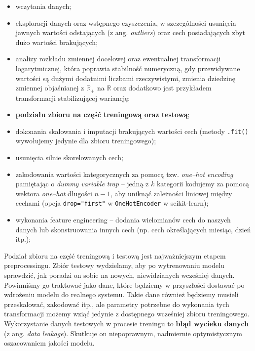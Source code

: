 \documentclass{myclass}
\numberwithin{equation}{section}
\begin{document}
\begin{itemize}
   
    \item wczytania danych;
    
    \item eksploracji danych oraz wstępnego czyszczenia, w szczególności usunięcia jawnych wartości
    odstających (z ang. \textit{outliers}) oraz cech posiadających zbyt dużo wartości brakujących;

    \item analizy rozkładu zmiennej docelowej oraz ewentualnej transformacji logarytmicznej, która
    poprawia stabilność numeryczną, gdy przewidywane wartości są dużymi dodatnimi liczbami
    rzeczywistymi, zmienia dziedzinę zmiennej objaśnianej z \(\mathbb{R}_+\) na \(\mathbb{R}\) oraz
    dodatkowo jest przykładem transformacji stabilizującej wariancję;
    
    \item \textbf{podziału zbioru na część treningową oraz testową};

    \item dokonania skalowania i imputacji brakujących wartości cech (metody \texttt{.fit()}
    wywołujemy jedynie dla zbioru treningowego);

    \item usunięcia silnie skorelowanych cech;

    \item zakodowania wartości kategorycznych za pomocą tzw. \textit{one--hot encoding} pamiętając o
    \textit{dummy variable trap} -- jedną z \(k\) kategorii kodujemy za pomocą wektora
    \textit{one--hot} długości \(n-1\), aby uniknąć zależności liniowej między cechami (opcja
    \texttt{drop="first"} w \texttt{OneHotEncoder} w scikit-learn);

    \item wykonania feature engineering -- dodania wielomianów cech do naszych danych lub
    skonstruowania innych cech (np. cech określających miesiąc, dzień itp.);

\end{itemize}

Podział zbioru na część treningową i testową jest najważniejszym etapem preprocessingu. Zbiór
testowy wydzielamy, aby po wytrenowaniu modelu sprawdzić, jak poradzi on sobie na nowych,
niewidzianych wcześniej danych. Powinniśmy go traktować jako dane, które będziemy w przyszłości
dostawać po wdrożeniu modelu do realnego systemu. Takie dane również będziemy musieli przeskalować,
zakodować itp., ale parametry potrzebne do wykonania tych transformacji możemy wziąć jedynie z
dostępnego wcześniej zbioru treningowego. Wykorzystanie danych testowych w procesie treningu to
\textbf{błąd wycieku danych} (z ang. \textit{data leakage}). Skutkuje on niepoprawnym, nadmiernie
optymistycznym oszacowaniem jakości modelu.
\end{document}
